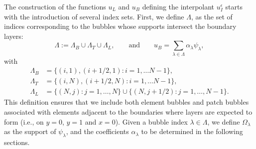\documentclass{article}
\newcommand{\ueps}{u^\epsilon}
\begin{document}





The construction of the functions
$u_L$ and $u_B$ defining the interpolant $\ueps_I$ starts with the introduction of several index sets. First, we define $\Lambda$, as the set of indices corresponding to the bubbles whose supports intersect the boundary layers:
\begin{equation}\label{def:Lambda+u_B}
\Lambda := \Lambda_B \cup \Lambda_T \cup \Lambda_L,
\qquad\text{and}\qquad
u_B = \sum_{\lambda \in \Lambda} \alpha_\lambda \psi_\lambda ,
\end{equation}
with
\begin{equation*}
\begin{aligned}
    \Lambda_B &= \{ (i,1),(i+1/2,1): i=1, \ldots N-1\},\\
    \Lambda_T &= \{ (i,N),(i+1/2,N): i=1, \ldots N-1\},\\
    \Lambda_L &= \{ (N,j): j=1,\ldots,N \}
    \cup \{ (N,j+1/2): j=1,\ldots,N-1 \}.
\end{aligned}
\end{equation*}
This definition ensures that we include both element bubbles and patch bubbles associated with elements adjacent to the boundaries where layers are expected to form (i.e., on $y=0$, $y=1$ and $x=0$).
Given a bubble index $\lambda \in \Lambda$, we define $\Omega_\lambda$ as the support of $\psi_\lambda$, and the coefficients $\alpha_\lambda$ to be determined in the following sections.
\end{document}
